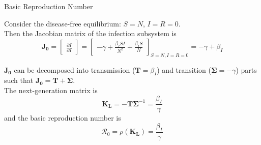 \begin{slide}{Basic Reproduction Number}

Consider the disease-free equilibrium: $S=N$, $I=R=0$.\\
\vfill
Then the Jacobian matrix of the infection subsystem is
$$\mathbf{J_0}	= \begin{bmatrix} \frac{\partial \dot{I}}{\partial I} \end{bmatrix}
			= \begin{bmatrix} - \gamma + \frac{\beta_I S I}{N^2} + \frac{\beta_I S}{N} \end{bmatrix}_{S=N , I = R = 0}
			= - \gamma + \beta_I $$

$\mathbf{J_0}$ can be decomposed into transmission ($\mathbf{T} = \beta_I$) and transition ($\mathbf{\Sigma} = - \gamma$) parts such that $\mathbf{J_0} = \mathbf{T} + \mathbf{\Sigma}$. \\
\vfill
The next-generation matrix is
$$\mathbf{K_L} = - \mathbf{T} \mathbf{\Sigma}^{-1} = \frac{\beta_I}{\gamma}$$
and the basic reproduction number is
$$\mathcal{R}_0 = \rho ( \mathbf{K_L} ) = \frac{\beta_I}{\gamma}$$

\end{slide}
